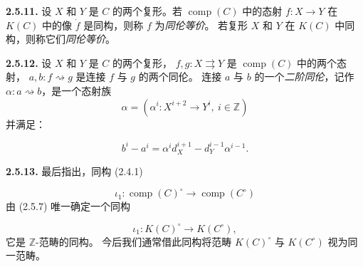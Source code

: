 %
\noindent\textbf{2.5.11.}\quad
{}
设 $X$ 和 $Y$ 是 $C$ 的两个复形。若 $\operatorname{comp}(C)$ 中的态射
$f\colon X\longrightarrow Y$ 在 $K(C)$ 中的像 $\dot f$ 是同构，则称
$f$ 为\emph{同伦等价}。
若复形 $X$ 和 $Y$ 在 $K(C)$ 中同构，则称它们\emph{同伦等价}。

\noindent\textbf{2.5.12.}\quad
{}
设 $X$ 和 $Y$ 是 $C$ 的两个复形，
$f,g\colon X\rightrightarrows Y$ 是 $\operatorname{comp}(C)$ 中的两个态射，
$a,b\colon f\rightsquigarrow g$ 是连接 $f$ 与 $g$ 的两个同伦。
连接 $a$ 与 $b$ 的一个\emph{二阶同伦}，记作
$\alpha\colon a\rightsquigarrow b$，是一个态射族
\[
  \alpha=(\alpha^i\colon X^{i+2}\longrightarrow Y^i,\ i\in\mathbb Z)
\]
并满足：

\begin{equation}
  b^i-a^i
  =\alpha^i d_X^{i+1}-d_Y^{i-1}\alpha^{i-1}.
  \tag{2.5.12.1}
\end{equation}

\noindent\textbf{2.5.13.}\quad
最后指出，同构 (2.4.1)

\begin{equation*}
  \iota_1\colon
  \operatorname{comp}(C)^\circ
  \longrightarrow
  \operatorname{comp}(C^\circ)
\end{equation*}
由 (2.5.7) 唯一确定一个同构

\begin{equation*}
  \iota_1\colon
  K(C)^\circ
  \longrightarrow
  K(C^\circ),
\end{equation*}
它是 $\mathbb Z$-范畴的同构。
今后我们通常借此同构将范畴 $K(C)^\circ$ 与 $K(C^\circ)$ 视为同一范畴。
